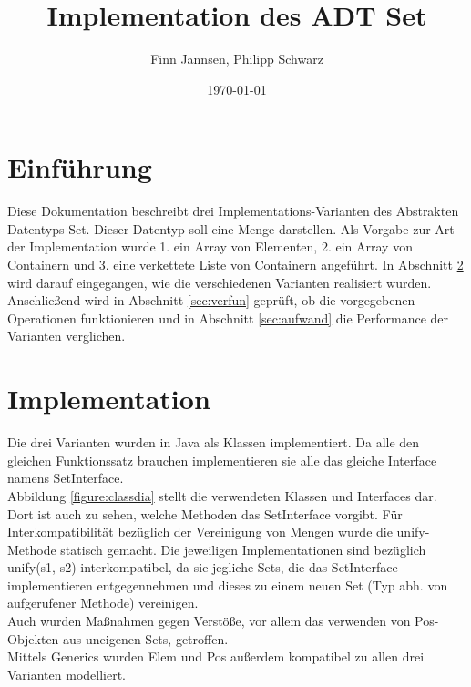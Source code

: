 \documentclass[11pt]{scrartcl}
\title{Implementation des ADT Set}
\author{Finn Jannsen, Philipp Schwarz}
\date{\today{}}
\begin{document}
\maketitle

\tableofcontents

\section{Einführung}
\label{sec:einfuehrung}

Diese Dokumentation beschreibt drei Implementations-Varianten des Abstrakten Datentyps Set. Dieser Datentyp soll eine Menge darstellen.
Als Vorgabe zur Art der Implementation wurde 1. ein Array von Elementen, 2. ein Array von Containern und 3. eine verkettete Liste von Containern angeführt.
In Abschnitt \ref{sec:implementation} wird darauf eingegangen, wie die verschiedenen Varianten realisiert wurden.
Anschließend wird in Abschnitt \ref{sec:verfun} geprüft, ob die vorgegebenen Operationen funktionieren und in Abschnitt \ref{sec:aufwand} die Performance der Varianten verglichen.

\section{Implementation}
\label{sec:implementation}

Die drei Varianten wurden in Java als Klassen implementiert. Da alle den gleichen Funktionssatz brauchen implementieren sie alle das gleiche Interface namens SetInterface.\\
Abbildung \ref{figure:classdia} stellt die verwendeten Klassen und Interfaces dar. Dort ist auch zu sehen, welche Methoden das SetInterface vorgibt. Für Interkompatibilität bezüglich der Vereinigung von Mengen wurde die unify-Methode statisch gemacht. Die jeweiligen Implementationen sind bezüglich unify(s1, s2) interkompatibel, da sie jegliche Sets, die das SetInterface implementieren entgegennehmen und dieses zu einem neuen Set (Typ abh. von aufgerufener Methode) vereinigen.\\
Auch wurden Maßnahmen gegen Verstöße, vor allem das verwenden von Pos-Objekten aus uneigenen Sets, getroffen.\\
Mittels Generics wurden Elem und Pos außerdem kompatibel zu allen drei Varianten modelliert.
\end{document}
